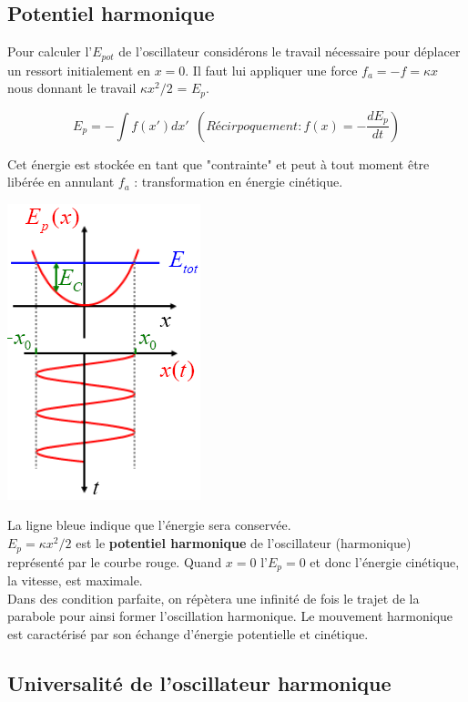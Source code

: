 \documentclass	[11pt, a4paper, openany]{book}
\begin{document}
	\subsection{Potentiel harmonique}
	Pour calculer l'$E_{pot}$ de l'oscillateur considérons le travail nécessaire pour déplacer un ressort initialement en $x = 0$. Il faut lui appliquer une force $f_a = -f = \kappa x$ nous donnant le travail $\kappa x^2/2$ = $E_p$. 
	
	\begin{equation}
		E_p = - \int f(x') dx'\ \ \left(Récirpoquement : f(x) = -\frac{dE_p}{dt}\right)
	\end{equation}
	
	Cet énergie est stockée en tant que "contrainte" et peut à tout moment être libérée en annulant $f_a$ : transformation en énergie cinétique.
	\begin{center}
		\includegraphics[scale=0.45]{oo/image3.png}
	\end{center}
	La ligne bleue indique que l'énergie sera conservée.\\
	$E_p = \kappa x^2 / 2$ est le \textbf{potentiel harmonique} de l'oscillateur (harmonique) représenté par le courbe rouge. Quand $x = 0$ l'$E_p = 0$ et donc l'énergie cinétique, la vitesse, est maximale.\\
	Dans des condition parfaite, on répètera une infinité de fois le trajet de la parabole pour ainsi former l'oscillation harmonique. Le mouvement harmonique est caractérisé par son échange d'énergie potentielle et cinétique.
	
	\subsection{Universalité de l'oscillateur harmonique}
\end{document}
